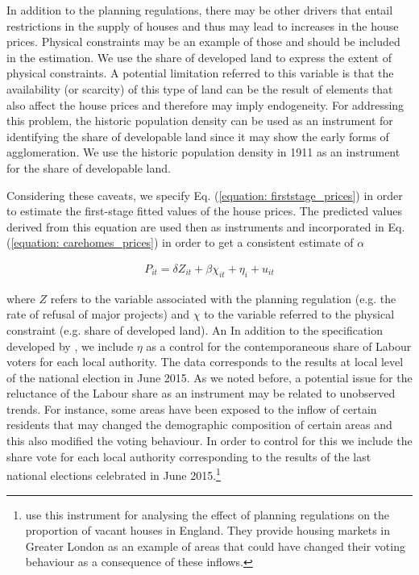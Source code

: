 \documentclass[12pt,letterpaper]{article}
\begin{document}
In addition to the planning regulations, there may be other drivers that entail 
restrictions in the supply of houses and thus may lead to increases in the house 
prices. Physical constraints may be an example of those and should be included in the 
estimation. We use the share of developed land to express the extent of physical 
constraints. A potential limitation referred to this variable is that 
  the availability (or scarcity) of this type of land can be the result of elements that 
  also affect the house prices and therefore may imply endogeneity. For 
  addressing this problem, the historic population density can be used as an 
  instrument for identifying the share of developable land since it may show the 
  early forms of agglomeration. We use the historic population density in 1911 
  as an instrument for the share of developable land. 
  
Considering these caveats, we specify Eq. (\ref{equation: firststage_prices}) in order to estimate the
 first-stage fitted values of the
 house prices. The predicted values derived from this equation are used then as instruments and incorporated in
 Eq. (\ref{equation: carehomes_prices}) in order to get a consistent estimate of $\alpha$

  \begin{eqnarray}
\label{equation: firststage_prices}
    P_{it} = \delta Z_{it} + \beta \chi_{it} + \eta_{i} + u_{it} 
 \end{eqnarray}

 where $Z$ refers to the variable associated with the planning regulation (e.g. the rate of refusal of major projects) and $\chi$  
 to the variable referred to the physical constraint (e.g. share of developed land). An  In addition to the specification developed by 
\cite{hilber2016supply}, we include $\eta$ as a control for the contemporaneous share 
 of Labour voters for each local authority. The data corresponds to the results at local level of the national election in June 
2015.  As we noted before, a potential issue for the reluctance of the Labour share as an instrument may be related to 
unobserved trends. For instance, some areas have been exposed to the inflow of
certain residents that may changed the demographic composition of certain areas and this also modified the voting behaviour. In order to 
control for this we include the share vote for each local authority 
corresponding to the results of the last national elections celebrated in June 
2015.\footnote{ \citet{cheshire2016} use this instrument for analysing the effect of planning regulations on the 
proportion of vacant houses in England. They provide housing markets in Greater London as an example of areas
that could have changed  their voting behaviour as a consequence of these inflows.}
\end{document}
